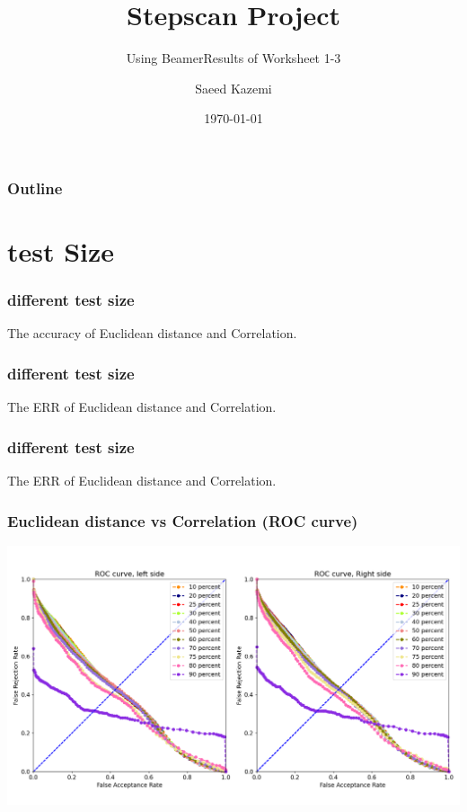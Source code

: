 \documentclass{beamer}
\subtitle{Using Beamer}
\title{ \textbf{Stepscan Project}}
\subtitle{Results of Worksheet 1-3}
\date{\today}
\author{Saeed Kazemi}
\institute{ University of New Brunswick}
\begin{document}
\begin{frame}
\titlepage
\end{frame}


\begin{frame}
\frametitle{Outline}
\tableofcontents
\end{frame}


\section{test Size}

\begin{frame}
\frametitle{different test size}
\tiny
\begin{table}
\centering
\captionsetup{labelformat=empty}
\caption{\small The accuracy of Euclidean distance and Correlation.}
\label{tab:parameters condition}

\end{table}
\end{frame}
\begin{frame}
\frametitle{different test size}
\tiny
\begin{table}
\centering
\captionsetup{labelformat=empty}
\caption{\small The  ERR of Euclidean distance and Correlation.}
\label{tab:parameters condition}

\end{table}
\end{frame}
\begin{frame}
\frametitle{different test size}
\tiny
\begin{table}
\centering
\captionsetup{labelformat=empty}
\caption{\small The  ERR of Euclidean distance and Correlation.}
\label{tab:parameters condition}

\end{table}
\end{frame}


\begin{frame}
\centering
\frametitle{Euclidean distance vs Correlation (ROC curve)}
\includegraphics[scale=0.3]{Manuscripts/src/figures/testsize.png}
\end{frame}
\end{document}

